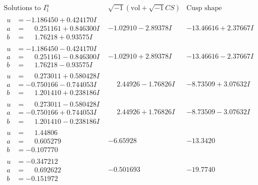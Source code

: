 \documentclass[1p]{elsarticle_modified}
\theoremstyle{definition}
\newcommand{\I}{\sqrt{-1}}
\begin{document}
$$\begin{array}{c|c|c}  
\text{Solutions to }I^u_{1}& \I (\text{vol} + \sqrt{-1}CS) & \text{Cusp shape}\\
 \hline 
\begin{aligned}
u &= -1.186450 + 0.424170 I \\
a &= \phantom{-}0.251161 + 0.846300 I \\
b &= \phantom{-}1.76218 + 0.93575 I\end{aligned}
 & -1.02910 - 2.89378 I & -13.46616 + 2.37667 I \\ \hline\begin{aligned}
u &= -1.186450 - 0.424170 I \\
a &= \phantom{-}0.251161 - 0.846300 I \\
b &= \phantom{-}1.76218 - 0.93575 I\end{aligned}
 & -1.02910 + 2.89378 I & -13.46616 - 2.37667 I \\ \hline\begin{aligned}
u &= \phantom{-}0.273011 + 0.580428 I \\
a &= -0.750166 - 0.744053 I \\
b &= \phantom{-}1.201410 + 0.238186 I\end{aligned}
 & \phantom{-}2.44926 - 1.76826 I & -8.73509 + 3.07632 I \\ \hline\begin{aligned}
u &= \phantom{-}0.273011 - 0.580428 I \\
a &= -0.750166 + 0.744053 I \\
b &= \phantom{-}1.201410 - 0.238186 I\end{aligned}
 & \phantom{-}2.44926 + 1.76826 I & -8.73509 - 3.07632 I \\ \hline\begin{aligned}
u &= \phantom{-}1.44806\phantom{ +0.000000I} \\
a &= \phantom{-}0.605279\phantom{ +0.000000I} \\
b &= -0.107770\phantom{ +0.000000I}\end{aligned}
 & -6.65928\phantom{ +0.000000I} & -13.3420\phantom{ +0.000000I} \\ \hline\begin{aligned}
u &= -0.347212\phantom{ +0.000000I} \\
a &= \phantom{-}0.692622\phantom{ +0.000000I} \\
b &= -0.151972\phantom{ +0.000000I}\end{aligned}
 & -0.501693\phantom{ +0.000000I} & -19.7740\phantom{ +0.000000I} \\ \hline\begin{aligned}

\end{aligned}
\end{array}$$
\end{document}
